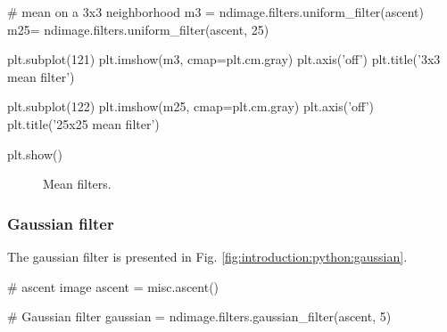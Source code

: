 \begin{python}
# mean on a 3x3 neighborhood
m3 = ndimage.filters.uniform_filter(ascent)
m25= ndimage.filters.uniform_filter(ascent, 25)

plt.subplot(121)
plt.imshow(m3, cmap=plt.cm.gray)
plt.axis('off')
plt.title('3x3 mean filter')

plt.subplot(122)
plt.imshow(m25, cmap=plt.cm.gray)
plt.axis('off')
plt.title('25x25 mean filter')

plt.show()
\end{python}

\begin{figure}[H]
 \centering\caption{Mean filters.}
 \hspace{1cm}
 \label{fig:introduction:python:mean}%
\end{figure}

\subsubsection{Gaussian filter}
The gaussian filter is presented in Fig. \ref{fig:introduction:python:gaussian}.
\begin{python}
# ascent image
ascent = misc.ascent()

# Gaussian filter
gaussian = ndimage.filters.gaussian_filter(ascent, 5)
\end{python}

